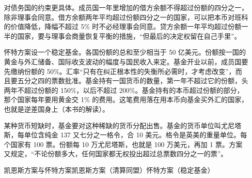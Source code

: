 对债务国的约束更具体。成员国一年里增加的借方余额不得超过份额的四分之一，除非理事会同意\cite{frb1943}。借方余额两年平均超过份额四分之一的国家，可以把本币对班科的价值降低，降幅不超过 5\% 时不必经理事会同意\cite{frb1943}。贷方余额一年平均超过份额一半的国家，要与理事会商量恢复平衡的措施，“但最后的决定权留在自己手里”\cite{frb1943}。

怀特方案设一个稳定基金。各国份额的总和至少相当于 50 亿美元\cite{frb1943}。份额按一国的黄金与外汇储备、国际收支波动的幅度与国民收入来定\cite{frb1943}。基金开业以前，成员国要先缴纳份额的 50\%\cite{frb1943}。汇率“只有在纠正根本性的失衡所必需时，才考虑改变”，而且要五分之四的票数批准\cite{frb1943}。基金持有一国货币的数量，第一年不超过它的份额，头两年不超过份额的 150\%，以后不超过 200\%\cite{frb1943}。基金持有的本币超过份额的部分，那个国家每年要用黄金交 1\% 的费用\cite{frb1943}。这笔费用落在用本币向基金买外汇的国家，也就是逆差国身上（本书的解读）。

某种货币短缺时，基金要对这种稀缺的货币分配出售\cite{frb1943}。基金的货币单位叫尤尼塔斯，每单位含纯金 137 又七分之一格令，合 10 美元\cite{frb1943}。格令是英美的重量单位。每个国家有 100 票。份额每 10 万尤尼塔斯，也就是 100 万美元，再加 1 票\cite{frb1943}。方案又规定，“不论份额多大，任何国家都无权投出超过总票数四分之一的票”\cite{frb1943}。

\begin{compare}{凯恩斯方案与怀特方案}{凯恩斯方案（清算同盟）}{怀特方案（稳定基金）}
\end{compare}

